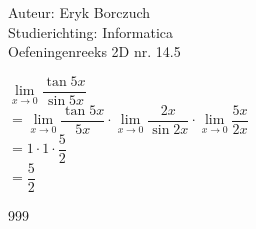 \documentclass[a4paper]{article}
\begin{document}
  
\noindent \large Auteur: Eryk Borczuch \\
\noindent \large Studierichting: Informatica\\
\noindent \large Oefeningenreeks 2D nr. 14.5\\

\medskip

\normalsize

$\lim\limits_{x \rightarrow 0} \dfrac{\tan 5x}{\sin 5x} $\\

$= \lim\limits_{x \rightarrow 0} \dfrac{\tan 5x}{5x} \cdot \lim\limits_{x \rightarrow 0} \dfrac{2x}{\sin 2x} \cdot \lim\limits_{x \rightarrow 0} \dfrac{5x}{2x}$\\

$= 1 \cdot1 \cdot \dfrac{5}{2}$\\

$= \dfrac{5}{2}$
\begin{thebibliography}{999}
\end{thebibliography}
\end{document}
